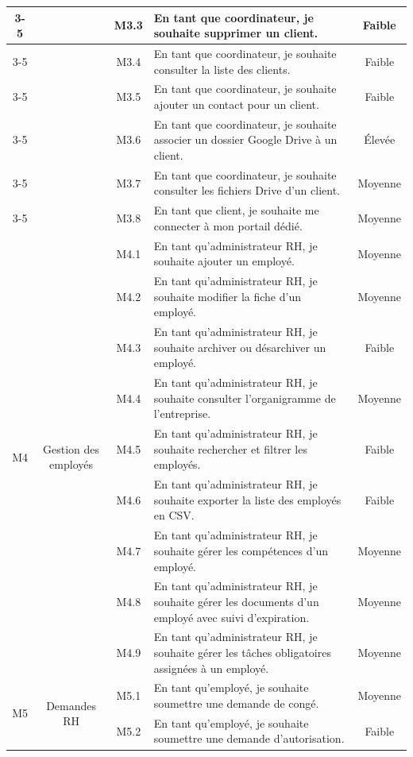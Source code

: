 \begin{longtable}{|c|c|c|p{7.2cm}|c|}
\cline{3-5}
 & & M3.3 & En tant que coordinateur, je souhaite supprimer un client. & Faible \\
\cline{3-5}
 & & M3.4 & En tant que coordinateur, je souhaite consulter la liste des clients. & Faible \\
\cline{3-5}
 & & M3.5 & En tant que coordinateur, je souhaite ajouter un contact pour un client. & Faible \\
\cline{3-5}
 & & M3.6 & En tant que coordinateur, je souhaite associer un dossier Google Drive à un client. & Élevée \\
\cline{3-5}
 & & M3.7 & En tant que coordinateur, je souhaite consulter les fichiers Drive d'un client. & Moyenne \\
\cline{3-5}
 & & M3.8 & En tant que client, je souhaite me connecter à mon portail dédié. & Moyenne \\
\hline
\multirow{9}{*}{M4} & \multirow{9}{*}{Gestion des employés} & M4.1 & En tant qu'administrateur RH, je souhaite ajouter un employé. & Moyenne \\
\cline{3-5}
 & & M4.2 & En tant qu'administrateur RH, je souhaite modifier la fiche d'un employé. & Moyenne \\
\cline{3-5}
 & & M4.3 & En tant qu'administrateur RH, je souhaite archiver ou désarchiver un employé. & Faible \\
\cline{3-5}
 & & M4.4 & En tant qu'administrateur RH, je souhaite consulter l'organigramme de l'entreprise. & Moyenne \\
\cline{3-5}
 & & M4.5 & En tant qu'administrateur RH, je souhaite rechercher et filtrer les employés. & Faible \\
\cline{3-5}
 & & M4.6 & En tant qu'administrateur RH, je souhaite exporter la liste des employés en CSV. & Faible \\
\cline{3-5}
 & & M4.7 & En tant qu'administrateur RH, je souhaite gérer les compétences d'un employé. & Moyenne \\
\cline{3-5}
 & & M4.8 & En tant qu'administrateur RH, je souhaite gérer les documents d'un employé avec suivi d'expiration. & Moyenne \\
\cline{3-5}
 & & M4.9 & En tant qu'administrateur RH, je souhaite gérer les tâches obligatoires assignées à un employé. & Moyenne \\
\hline
\multirow{8}{*}{M5} & \multirow{8}{*}{Demandes RH} & M5.1 & En tant qu'employé, je souhaite soumettre une demande de congé. & Moyenne \\
\cline{3-5}
 & & M5.2 & En tant qu'employé, je souhaite soumettre une demande d'autorisation. & Faible \\

\end{longtable}
